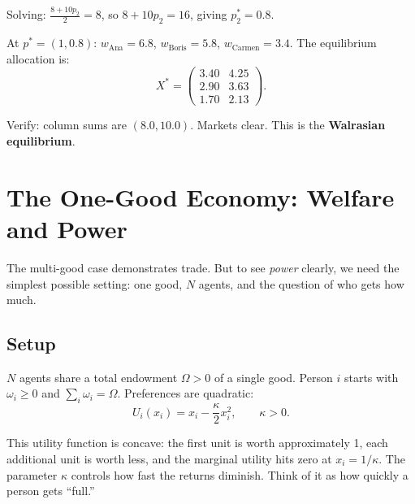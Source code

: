 \documentclass[../structural_economics_book.tex]{subfiles}
\begin{document}
Solving: $\frac{8 + 10p_2}{2} = 8$, so $8 + 10p_2 = 16$, giving $p_2^* = 0.8$.

At $p^* = (1, 0.8)$: $w_{\text{Ana}} = 6.8$, $w_{\text{Boris}} = 5.8$, $w_{\text{Carmen}} = 3.4$. The equilibrium allocation is:
\begin{equation}
X^* = \begin{pmatrix} 3.40 & 4.25 \\ 2.90 & 3.63 \\ 1.70 & 2.13 \end{pmatrix}.
\end{equation}

Verify: column sums are $(8.0, 10.0)$. Markets clear. This is the \textbf{Walrasian equilibrium}.


\section{The One-Good Economy: Welfare and Power}
\label{ch01:sec:one_good}

The multi-good case demonstrates trade. But to see \textit{power} clearly, we need the simplest possible setting: one good, $N$ agents, and the question of who gets how much.

\subsection{Setup}

$N$ agents share a total endowment $\Omega > 0$ of a single good. Person $i$ starts with $\omega_i \geq 0$ and $\sum_i \omega_i = \Omega$. Preferences are quadratic:
\begin{equation}\label{ch01:eq:LQ}
U_i(x_i) = x_i - \frac{\kappa}{2}x_i^2, \qquad \kappa > 0.
\end{equation}

This utility function is concave: the first unit is worth approximately 1, each additional unit is worth less, and the marginal utility hits zero at $x_i = 1/\kappa$. The parameter $\kappa$ controls how fast the returns diminish. Think of it as how quickly a person gets ``full.''
\end{document}
